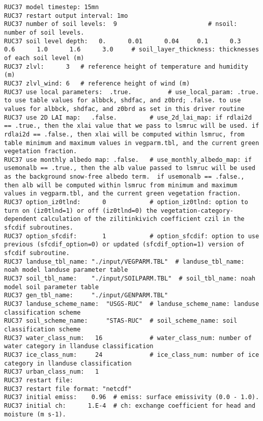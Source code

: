  \begin{Verbatim}[frame=single]
RUC37 model timestep: 15mn
RUC37 restart output interval: 1mo 
RUC37 number of soil levels:  9                         # nsoil: number of soil levels.
RUC37 soil level depth:   0.      0.01      0.04     0.1      0.3      0.6      1.0      1.6      3.0     # soil_layer_thickness: thicknesses of each soil level (m)
RUC37 zlvl:      3   # reference height of temperature and humidity (m) 
RUC37 zlvl_wind: 6   # reference height of wind (m)
RUC37 use local parameters:  .true.          # use_local_param: .true. to use table values for albbck, shdfac, and z0brd; .false. to use values for albbck, shdfac, and z0brd as set in this driver routine
RUC37 use 2D LAI map:   .false.         # use_2d_lai_map: if rdlai2d == .true., then the xlai value that we pass to lsmruc will be used. if rdlai2d == .false., then xlai will be computed within lsmruc, from table minimum and maximum values in vegparm.tbl, and the current green vegetation fraction.
RUC37 use monthly albedo map: .false.   # use_monthly_albedo_map: if usemonalb == .true., then the alb value passed to lsmruc will be used as the background snow-free albedo term.  if usemonalb == .false., then alb will be computed within lsmruc from minimum and maximum values in vegparm.tbl, and the current green vegetation fraction.
RUC37 option_iz0tlnd:      0            # option_iz0tlnd: option to turn on (iz0tlnd=1) or off (iz0tlnd=0) the vegetation-category-dependent calculation of the zilitinkivich coefficient czil in the sfcdif subroutines.
RUC37 option_sfcdif:       1            # option_sfcdif: option to use previous (sfcdif_option=0) or updated (sfcdif_option=1) version of sfcdif subroutine.
RUC37 landuse_tbl_name: "./input/VEGPARM.TBL"  # landuse_tbl_name: noah model landuse parameter table
RUC37 soil_tbl_name:    "./input/SOILPARM.TBL"  # soil_tbl_name: noah model soil parameter table
RUC37 gen_tbl_name:     "./input/GENPARM.TBL"  
RUC37 landuse_scheme_name:  "USGS-RUC"  # landuse_scheme_name: landuse classification scheme
RUC37 soil_scheme_name:     "STAS-RUC"  # soil_scheme_name: soil classification scheme
RUC37 water_class_num:   16             # water_class_num: number of water category in llanduse classification
RUC37 ice_class_num:     24             # ice_class_num: number of ice category in llanduse classification
RUC37 urban_class_num:   1 
RUC37 restart file:
RUC37 restart file format: "netcdf"
RUC37 initial emiss:    0.96  # emiss: surface emissivity (0.0 - 1.0).
RUC37 initial ch:      1.E-4  # ch: exchange coefficient for head and moisture (m s-1).

\end{Verbatim}
